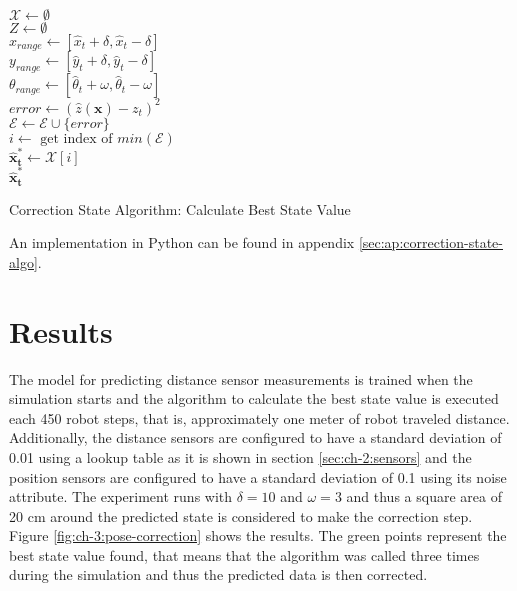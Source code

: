 \IncMargin{1em}
\begin{algorithm}

\BlankLine
  $\mathcal{X} \leftarrow \emptyset$\\
  $Z \leftarrow \emptyset$\\
  $x_{range} \leftarrow [\hat x_t + \delta, \hat x_t - \delta]$\\
  $y_{range} \leftarrow [\hat y_t + \delta, \hat y_t - \delta]$\\
  $\theta_{range} \leftarrow [\hat \theta_t + \omega, \hat \theta_t - \omega]$\\
  \BlankLine
  \BlankLine
   {
  	$error \leftarrow (\hat z(\mathbf{x}) - z_t) ^ 2$\\
  	$\mathcal{E} \leftarrow \mathcal{E} \cup \{error\}$\\
  }
  \BlankLine
  $i \leftarrow \text{ get index of }min(\mathcal{E})$\\
  $\mathbf{\hat x_t^*} \leftarrow \mathcal{X}[i]$\\
  
  \Return $\mathbf{\hat x_t^*} $
\caption{Correction State Algorithm: Calculate Best State Value}

\label{algo:ch-3:x-creation}
\end{algorithm}\DecMargin{1em}

An implementation in Python can be found in appendix \ref{sec:ap:correction-state-algo}.

\section{Results}
The model for predicting distance sensor measurements is trained when the simulation starts and the algorithm to calculate the best state value is executed each 450 robot steps, that is, approximately one meter of robot traveled distance. Additionally, the distance sensors are configured to have a standard deviation of 0.01 using a lookup table as it is shown in section \ref{sec:ch-2:sensors} and the position sensors are configured to have a standard deviation of 0.1 using its noise attribute. The experiment runs with $\delta=10$ and $\omega=3$ and thus a square area of 20 cm around the predicted state is considered to make the correction step. Figure \ref{fig:ch-3:pose-correction} shows the results. The green points represent the best state value found, that means that the algorithm was called three times during the simulation and thus the predicted data is then corrected. 

